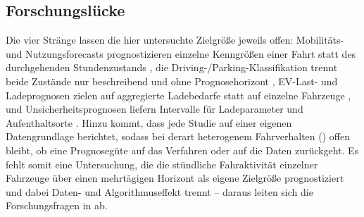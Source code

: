 \subsection{Forschungslücke}
\label{sec:forschungsluecke}

Die vier Stränge lassen die hier untersuchte Zielgröße jeweils offen: Mobilitäts- und Nutzungsforecasts prognostizieren einzelne Kenngrößen einer Fahrt statt des durchgehenden Stundenzustands \parencite{lindroth2024online,individual2025activitychain}, die Driving-/Parking-Klassifikation trennt beide Zustände nur beschreibend und ohne Prognosehorizont \parencite{kumar2023driving,su2025parking}, EV-Last- und Ladeprognosen zielen auf aggregierte Ladebedarfe statt auf einzelne Fahrzeuge \parencite{sanami2025demand,amaraouali2025quantifying}, und Unsicherheitsprognosen liefern Intervalle für Ladeparameter und Aufenthaltsorte \parencite{ali2024location,amaraouali2025quantifying}. Hinzu kommt, dass jede Studie auf einer eigenen Datengrundlage berichtet, sodass bei derart heterogenem Fahrverhalten () offen bleibt, ob eine Prognosegüte auf das Verfahren oder auf die Daten zurückgeht. Es fehlt somit eine Untersuchung, die die stündliche Fahraktivität einzelner Fahrzeuge über einen mehrtägigen Horizont als eigene Zielgröße prognostiziert und dabei Daten- und Algorithmuseffekt trennt -- daraus leiten sich die Forschungsfragen in  ab.
